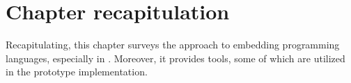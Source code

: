 \documentclass[thesis-solanki.tex]{subfiles}
\begin{document}
\section{Chapter recapitulation}
Recapitulating, this chapter surveys the approach to embedding programming languages, especially  in .
Moreover, it provides tools, some of which are utilized in the prototype implementation.   

\ifMain
\begin{scope}
  \nolinenumbers
  \enotesize
  \par
  \begin{singlespace}
  \setlength{\parskip}{12pt plus 2pt minus 1pt}
  \theendnotes
  \par
  \end{singlespace}
\end{scope}
\fi
\end{document}
